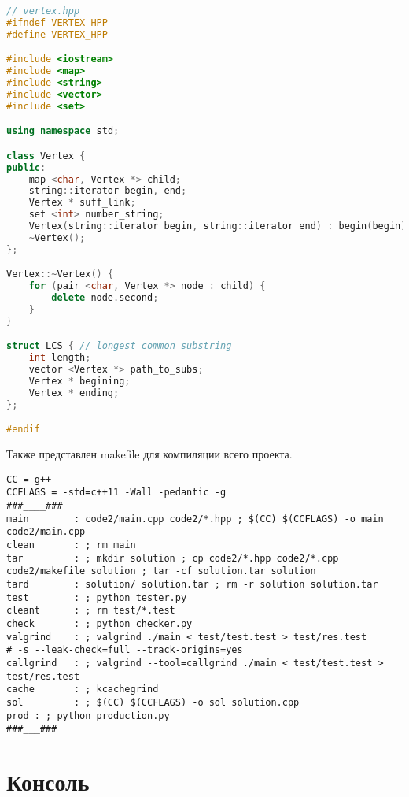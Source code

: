 \begin{lstlisting}[language=C++]
// vertex.hpp
#ifndef VERTEX_HPP
#define VERTEX_HPP

#include <iostream>
#include <map>
#include <string>
#include <vector>
#include <set>

using namespace std;

class Vertex {
public:
    map <char, Vertex *> child;
    string::iterator begin, end;
    Vertex * suff_link;
    set <int> number_string;
    Vertex(string::iterator begin, string::iterator end) : begin(begin), end(end), suff_link(nullptr) {};
    ~Vertex();
};

Vertex::~Vertex() {
    for (pair <char, Vertex *> node : child) {
        delete node.second;
    }
}

struct LCS { // longest common substring
    int length;
    vector <Vertex *> path_to_subs;
    Vertex * begining;
    Vertex * ending;
};

#endif
\end{lstlisting}

Также представлен makefile для компиляции всего проекта.

\lstset{language=[gnu] make}

\begin{lstlisting}
CC = g++
CCFLAGS = -std=c++11 -Wall -pedantic -g
###____###
main 		: code2/main.cpp code2/*.hpp ; $(CC) $(CCFLAGS) -o main code2/main.cpp
clean		: ; rm main
tar 		: ; mkdir solution ; cp code2/*.hpp code2/*.cpp code2/makefile solution ; tar -cf solution.tar solution
tard		: solution/ solution.tar ; rm -r solution solution.tar
test		: ; python tester.py
cleant		: ; rm test/*.test
check		: ; python checker.py
valgrind 	: ; valgrind ./main < test/test.test > test/res.test
# -s --leak-check=full --track-origins=yes
callgrind 	: ; valgrind --tool=callgrind ./main < test/test.test > test/res.test
cache 		: ; kcachegrind
sol 		: ; $(CC) $(CCFLAGS) -o sol solution.cpp
prod : ; python production.py
###___###
\end{lstlisting}

\pagebreak

\section{Консоль}

